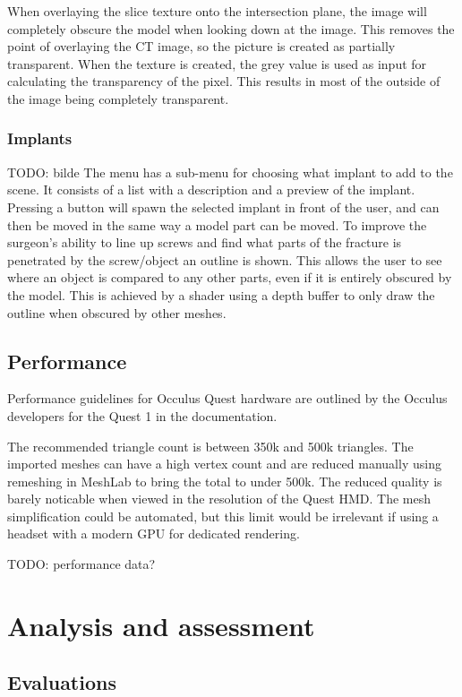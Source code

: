 \documentclass[a4paper]{report}
\begin{document}
When overlaying the slice texture onto the intersection plane, the image will completely obscure the model when looking down at the image. This removes the point of overlaying the CT image, so the picture is created as partially transparent. When the texture is created, the grey value is used as input for calculating the transparency of the pixel. This results in most of the outside of the image being completely transparent.

\subsection{Implants}
TODO: bilde
The menu has a sub-menu for choosing what implant to add to the scene. It consists of a list with a description and a preview of the implant. Pressing a button will spawn the selected implant in front of the user, and can then be moved in the same way a model part can be moved.
To improve the surgeon's ability to line up screws and find what parts of the fracture is penetrated by the screw/object an outline is shown. This allows the user to see where an object is compared to any other parts, even if it is entirely obscured by the model. This is achieved by a shader using a depth buffer to only draw the outline when obscured by other meshes\cite{technologies_unity_nodate-1}.
\section{Performance}
Performance guidelines for Occulus Quest hardware are outlined by the Occulus developers for the Quest 1 in the documentation\cite{noauthor_oculus_nodate}.

The recommended triangle count is between 350k and 500k triangles\cite{noauthor_oculus_nodate}. The imported meshes can have a high vertex count and are reduced manually using remeshing in MeshLab\cite{cignoni_meshlab_2008} to bring the total to under 500k. The reduced quality is barely noticable when viewed in the resolution of the Quest HMD.
The mesh simplification could be automated, but this limit would be irrelevant if using a headset with a modern GPU for dedicated rendering.

TODO: performance data?

\chapter{Analysis and assessment}\label{analysis and assessment}


\section{Evaluations}
\end{document}
